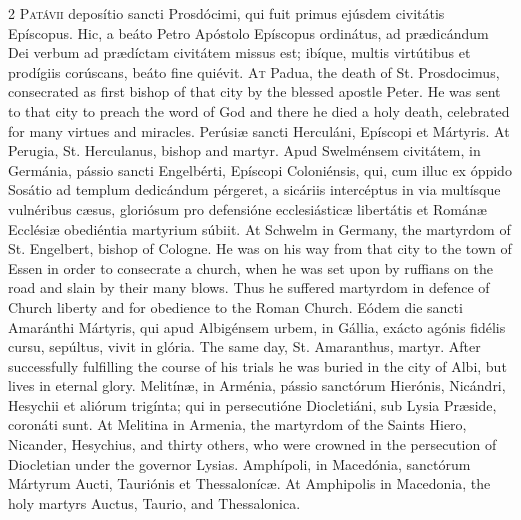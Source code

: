 \begin{paracol}{2}
\lettrine[lines=2]{P}{atávii} deposítio 
 sancti Prosdócimi, qui fuit primus ejúsdem civitátis Epíscopus. Hic, a 
 beáto Petro Apóstolo Epíscopus ordinátus, ad prædicándum Dei verbum ad 
 prædíctam civitátem missus est; ibíque, multis virtútibus et prodígiis 
 corúscans, beáto fine quiévit.
\switchcolumn
{}
\lettrine[lines=2]{A}{t} Padua, the death of St. 
 Prosdocimus, consecrated as first bishop of that city by the blessed apostle 
 Peter. He was sent to that city to preach the word of God and there he 
 died a holy death, celebrated for many virtues and miracles.
\switchcolumn*
{}
Perúsiæ sancti 
 Herculáni, Epíscopi et Mártyris.
\switchcolumn
{}
At Perugia, St. Herculanus, bishop 
 and martyr.
\switchcolumn*
{}
Apud Swelménsem 
 civitátem, in Germánia, pássio sancti Engelbérti, Epíscopi Coloniénsis, qui, 
 cum illuc ex óppido Sosátio ad templum dedicándum pérgeret, a sicáriis 
 intercéptus in via multísque vulnéribus cæsus, gloriósum pro defensióne 
 ecclesiásticæ libertátis et Románæ Ecclésiæ obediéntia martyrium súbiit.
\switchcolumn
{}
At Schwelm in Germany, the martyrdom 
 of St. Engelbert, bishop of Cologne. He was on his way from that city 
 to the town of Essen in order to consecrate a church, when he was set upon 
 by ruffians on the road and slain by their many blows. Thus he 
 suffered martyrdom in defence of Church liberty and for obedience to the 
 Roman Church.
\switchcolumn*
{}
Eódem die sancti 
 Amaránthi Mártyris, qui apud Albigénsem urbem, in Gállia, exácto agónis 
 fidélis cursu, sepúltus, vivit in glória.
\switchcolumn
{}
The same day, St. Amaranthus, 
 martyr. After successfully fulfilling the course of his trials he was 
 buried in the city of Albi, but lives in eternal glory.
\switchcolumn*
{}
Melitínæ, in Arménia, pássio sanctórum Hierónis, Nicándri, Hesychii et aliórum trigínta; qui in 
 persecutióne Diocletiáni, sub Lysia Præside, coronáti sunt.
\switchcolumn
{}
At Melitina in Armenia, the 
 martyrdom of the Saints Hiero, Nicander, Hesychius, and thirty others, who 
 were crowned in the persecution of Diocletian under the governor Lysias.
\switchcolumn*
{}
Amphípoli, in 
 Macedónia, sanctórum Mártyrum Aucti, Tauriónis et Thessalonícæ.
\switchcolumn
{}
At Amphipolis in Macedonia, the holy 
 martyrs Auctus, Taurio, and Thessalonica.

\end{paracol}
